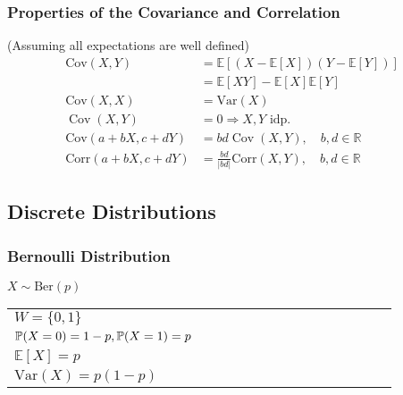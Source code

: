 \subsubsection{Properties of the Covariance and Correlation}
(Assuming all expectations are well defined)
\noindent\begin{align*}
    \mathrm{Cov}(X,Y)        & =\mathbb{E}[(X-\mathbb{E}[X])(Y-\mathbb{E}[Y])]             \\
                             & = \mathbb{E}[XY]-\mathbb{E}[X]\mathbb{E}[Y]                 \\
    \mathrm{Cov}(X,X)        & = \mathrm{Var}(X)                                           \\
    \operatorname{Cov}(X,Y)  & = 0 \Rightarrow X,Y\text{ idp.}                             \\
    \mathrm{Cov}(a+bX,c+dY)  & =bd\operatorname{Cov}(X,Y),\quad b,d\in\mathbb{R}           \\
    \mathrm{Corr}(a+bX,c+dY) & ={\frac{bd}{|bd|}}\mathrm{Corr}(X,Y),\quad b,d\in\mathbb{R}
\end{align*}

\subsection{Discrete Distributions}

\subsubsection{Bernoulli Distribution}
$X \sim \mathrm{Ber}(p)$

\renewcommand{\arraystretch}{1.3}
\setlength{\oldtabcolsep}{\tabcolsep}\setlength\tabcolsep{3pt}

\begin{tabularx}{\linewidth}{@{}p{0.5\linewidth}p{0.49\linewidth}@{}}
    $W=\{0,1\}$                                     &
    \multirow{4}{*}{
        
    }                                                 \\
    $\mathbb{P}(X=0)=1-p,\newline\mathbb{P}(X=1)=p$ & \\
    $\mathbb{E}[X] = p$                             & \\
    $\mathrm{Var}(X) = p(1-p)$                      &
\end{tabularx}

\renewcommand{\arraystretch}{1}
\setlength\tabcolsep{\oldtabcolsep}



